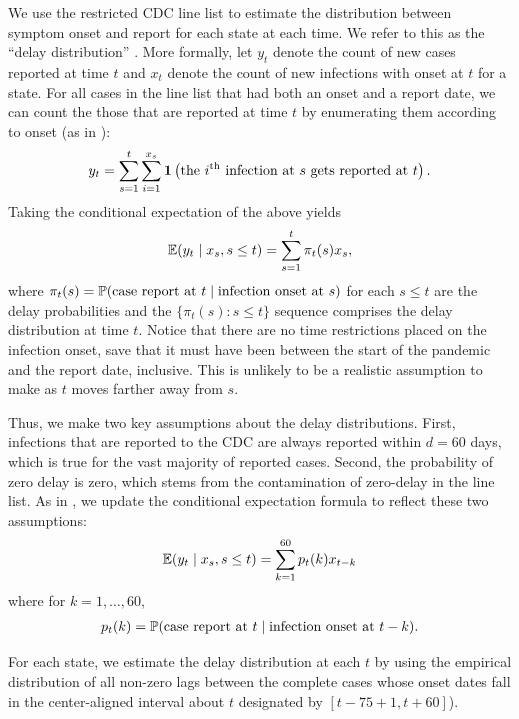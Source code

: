\documentclass{article}
\begin{document}
We use the restricted CDC line list to estimate the distribution between symptom
onset and report for each state at each time. We refer to this as the ``delay
distribution'' \citep[see
\autoref{fig:cases_to_infect_flowchart} or][]{jahja2022real}. More formally, let
$y_t$ denote the count of new cases reported at time $t$ and $x_t$ denote the
count of new infections with onset at $t$ for a state. For all cases in the line
list that had both an onset and a report date, we can count the those that are
reported at time $t$ by enumerating them according to onset (as in
\citealp{jahja2022real}):
\begin{align*}
y_t = \sum_{s=1}^{t} \sum_{i=1}^{x_s}\indicator \left ( \text{the }i\th\text{ infection at }
 s \text{ gets reported at }t \right ).
\end{align*}
Taking the conditional expectation of the above yields
\begin{align*}
\E(y_t \mid x_s, s \leq t) = \sum_{s=1}^{t} \pi_t(s) x_s ,
\end{align*}
where $\pi_t(s) = \P(\text{case report at }t \mid \text{infection onset at }s)$ for
each $s \leq t$ are the delay probabilities and the $\{ \pi_t(s) : s \leq t
\}$ sequence comprises the delay distribution at time $t$. Notice that
there are no time restrictions placed on the infection onset, save that it must
have been between the start of the pandemic and the report date, inclusive. This is
unlikely to be a realistic assumption to make as $t$ moves farther away from
$s$. 

Thus, we make two key assumptions about the delay distributions. First,
infections that are reported to the CDC are always reported within $d = 60$
days, which is true for the vast majority of reported cases. Second, the
probability of zero delay is zero, which stems from the contamination of
zero-delay in the line list. As in \citet{jahja2022real}, we update the
conditional expectation formula to reflect these two assumptions: 
\begin{align*}
\E(y_t \mid x_s, s \leq t) = \sum_{k=1}^{60} p_t(k) x_{t-k}
\end{align*}
where for $k = 1, \dots, 60$,
\begin{align*}
p_t(k) = \P(\text{case report at }t \mid \text{infection onset at }t-k).
\end{align*}

For each state, we estimate the delay distribution at each $t$ by using the empirical distribution of
all non-zero lags between the complete cases whose onset dates fall in the
center-aligned interval about $t$ designated by $[ t - 75 + 1, t + 60
]$). 
\end{document}
